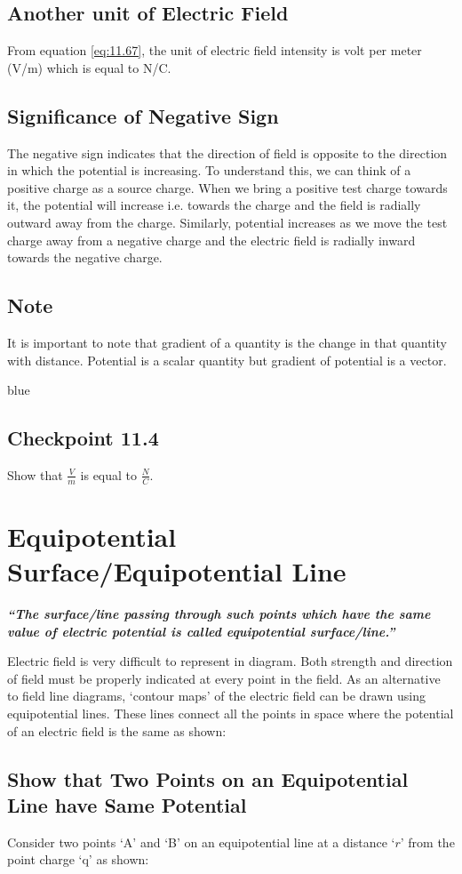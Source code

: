 \subsection*{Another unit of Electric Field}
From equation \ref{eq:11.67}, the unit of electric field intensity is
volt per meter (V/m) which is equal to N/C.
\subsection*{Significance of Negative Sign}
The negative sign indicates that the direction of field is opposite
to the direction in which the potential is increasing. To understand this, we can think of a positive charge as a source charge.
When we bring a positive test charge towards it,
the potential will increase i.e. towards the charge and the field is
radially outward away from the charge. Similarly, potential increases as we
move the test charge away from a negative charge and the electric
field is radially inward towards the negative charge.
\subsection*{Note}
It is important to note that gradient of a quantity is the change in that
quantity with distance. Potential is a scalar quantity but gradient of
potential is a vector.
\begin{mybox}{blue}{}
\subsection*{Checkpoint 11.4}
Show that $\frac{V}{m}$ is equal to $\frac{N}{C}$.
\end{mybox}
\section{Equipotential Surface/Equipotential Line}
\textit{\textbf{“The surface/line passing through such points which have
the same value of electric potential is called equipotential surface/line.”}}

Electric field is very difficult to represent in diagram.
Both strength and direction of field must be properly indicated at
every point in the field. As an alternative to field line diagrams,
‘contour maps’ of the electric field can be drawn using equipotential lines.
These lines connect all the points in space where the potential of an
electric field is the same as shown:
\subsection*{Show that Two Points on an Equipotential Line have Same
Potential}
Consider two points ‘A’ and ‘B’ on an equipotential line at a
distance ‘$r$’ from the point charge ‘q’ as shown:

